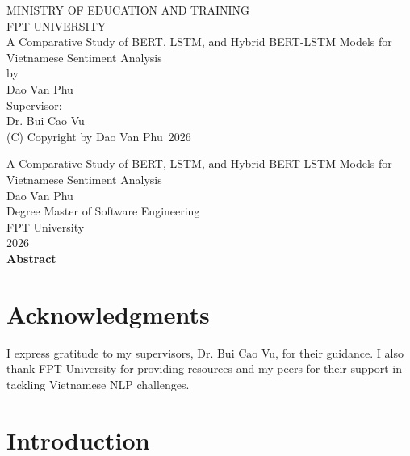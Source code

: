 \documentclass[12pt]{report} %
\newcommand{\thesistitle}{	
A Comparative Study of BERT, LSTM, and Hybrid BERT-LSTM Models for Vietnamese Sentiment Analysis}
\newcommand{\authorname}{Dao Van Phu}
\newcommand{\supervisor}{Dr. Bui Cao Vu}
\newcommand{\yearofconvocation}{2026}
\begin{document}
\begin{titlepage}
\thispagestyle{empty}
\begin{center}
{\large MINISTRY OF EDUCATION AND TRAINING}\\
{\large FPT UNIVERSITY}\\
\vspace{2cm}
{\LARGE \thesistitle}\\
\vspace{1cm}
by\\
{\large \authorname}\\

\vspace{1cm}
Supervisor:\\
\supervisor\\

\vspace{2cm}
(C) Copyright by \authorname\ \yearofconvocation\\
\end{center}
\end{titlepage}

\cleardoublepage
{}
\begin{center}
{\large \thesistitle}\\
{\large \authorname}\\
Degree Master of Software Engineering\\
FPT University\\
\yearofconvocation\\
\vspace{1cm}
\textbf{Abstract}\\
\end{center}


\chapter*{Acknowledgments}
I express gratitude to my supervisors, \supervisor, for their guidance. I also thank FPT University for providing resources and my peers for their support in tackling Vietnamese NLP challenges.

\tableofcontents

\listoftables

\listoffigures

\cleardoublepage
{}

\chapter{Introduction}
\end{document}
